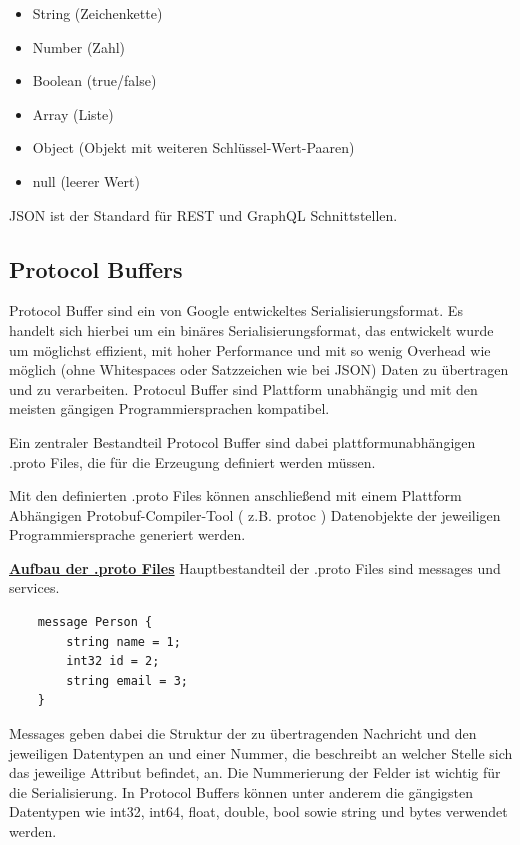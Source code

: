 \begin{itemize}
	\item String (Zeichenkette)
	\item Number (Zahl)
	\item Boolean (true/false)
	\item Array (Liste)
	\item Object (Objekt mit weiteren Schl\"ussel-Wert-Paaren)
	\item null (leerer Wert)
\end{itemize}


JSON ist der Standard für REST und GraphQL Schnittstellen.


\subsection{Protocol Buffers}
Protocol Buffer sind ein von Google entwickeltes Serialisierungsformat. Es handelt sich hierbei um ein binäres Serialisierungsformat, das entwickelt wurde um möglichst effizient, mit hoher Performance und mit so wenig Overhead wie möglich (ohne Whitespaces oder Satzzeichen wie bei JSON) Daten zu übertragen und zu verarbeiten. Protocul Buffer sind Plattform unabhängig und mit den meisten gängigen Programmiersprachen kompatibel.

Ein zentraler Bestandteil Protocol Buffer sind dabei plattformunabhängigen .proto Files, die für die Erzeugung definiert werden müssen.

Mit den definierten .proto Files können anschließend mit einem Plattform Abhängigen Protobuf-Compiler-Tool ( z.B. protoc ) Datenobjekte der jeweiligen Programmiersprache generiert werden.


\newpage
\textbf{\underline{Aufbau der .proto Files}}
\newline
Hauptbestandteil der .proto Files sind messages und services.

\begin{verbatim}
	message Person {
		string name = 1;
		int32 id = 2;
		string email = 3;
	}
\end{verbatim}

Messages geben dabei die Struktur der zu übertragenden Nachricht und den jeweiligen Datentypen an und einer Nummer, die beschreibt an welcher Stelle sich das jeweilige Attribut befindet, an. Die Nummerierung der Felder ist wichtig für die Serialisierung.
In Protocol Buffers können unter anderem die gängigsten Datentypen wie int32, int64, float, double, bool sowie string und bytes verwendet werden.

